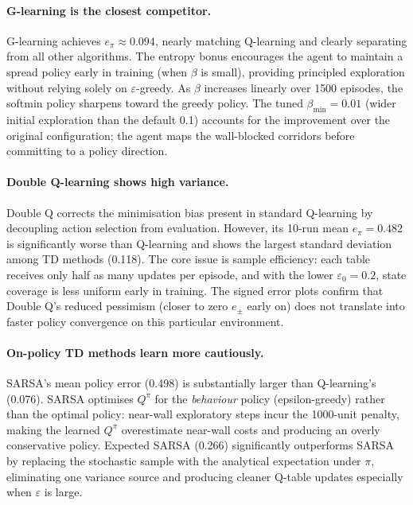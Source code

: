 \documentclass[11pt]{article}
\begin{document}
\paragraph{G-learning is the closest competitor.}
G-learning achieves $e_\pi \approx 0.094$, nearly matching Q-learning and
clearly separating from all other algorithms.  The entropy bonus encourages
the agent to maintain a spread policy early in training (when $\beta$ is
small), providing principled exploration without relying solely on
$\varepsilon$-greedy.  As $\beta$ increases linearly over 1500 episodes, the
softmin policy sharpens toward the greedy policy.  The tuned $\beta_{\min}=0.01$
(wider initial exploration than the default 0.1) accounts for the improvement
over the original configuration; the agent maps the wall-blocked corridors
before committing to a policy direction.

\paragraph{Double Q-learning shows high variance.}
Double Q corrects the minimisation bias present in standard Q-learning by
decoupling action selection from evaluation.  However, its 10-run mean
$e_\pi=0.482$ is significantly worse than Q-learning and shows the largest
standard deviation among TD methods (0.118).  The core issue is sample
efficiency: each table receives only half as many updates per episode, and
with the lower $\varepsilon_0=0.2$, state coverage is less uniform early in
training.  The signed error plots confirm that Double Q's reduced pessimism
(closer to zero $e_\pm$ early on) does not translate into faster policy
convergence on this particular environment.

\paragraph{On-policy TD methods learn more cautiously.}
SARSA's mean policy error (0.498) is substantially larger than Q-learning's
(0.076).  SARSA optimises $Q^\pi$ for the \emph{behaviour} policy
(epsilon-greedy) rather than the optimal policy: near-wall exploratory steps
incur the 1000-unit penalty, making the learned $Q^\pi$ overestimate near-wall
costs and producing an overly conservative policy.  Expected SARSA (0.266)
significantly outperforms SARSA by replacing the stochastic sample with the
analytical expectation under $\pi$, eliminating one variance source and
producing cleaner Q-table updates especially when $\varepsilon$ is large.
\end{document}
